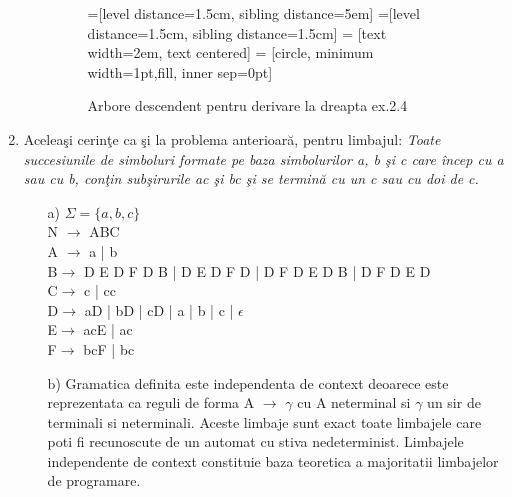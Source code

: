 \begin{enumerate}
\begin{enumerate}
\begin{figure}[H]
=[level distance=1.5cm, sibling distance=5em]
=[level distance=1.5cm, sibling distance=1.5cm]
 = [text width=2em, text centered]
 = [circle, minimum width=1pt,fill, inner sep=0pt]
\caption{Arbore descendent pentru derivare la dreapta ex.2.4}
\end{figure}
\end{enumerate}

\item
Aceleaşi cerinţe ca şi la problema anterioară, pentru limbajul: \textit{Toate succesiunile de simboluri formate pe baza simbolurilor a, b şi c care încep cu a sau cu b, conţin subşirurile ac şi bc şi se termină cu un c sau cu doi de c.}

\begin{enumerate}
\item[a)]
$\Sigma=\{a,b,c\}$\\
N $\rightarrow$ ABC\\
A $\rightarrow$ a | b \\
B$\rightarrow$ D E D F D B | D E D F D | D F D E D B | D F D E D \\
C$\rightarrow$ c | cc\\
D$\rightarrow$ aD | bD | cD | a | b | c | $\epsilon$\\
E$\rightarrow$ acE | ac\\
F$\rightarrow$ bcF | bc\\

\item[b)]
Gramatica definita este independenta de context deoarece este reprezentata ca reguli de forma A $\rightarrow$ $\gamma$ cu A neterminal si $\gamma$ un sir de terminali si neterminali. Aceste limbaje sunt exact toate limbajele care poti fi recunoscute de un automat cu stiva nedeterminist. Limbajele independente de context constituie baza teoretica a majoritatii limbajelor de programare. \\


\end{enumerate}
\end{enumerate}
